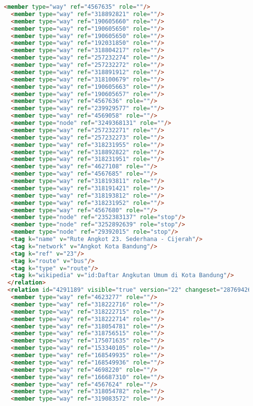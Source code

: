 \begin{lstlisting}[language=HTML,basicstyle=\tiny,caption=bandung1.xml]
  <member type="way" ref="4567635" role=""/>
  <member type="way" ref="318892821" role=""/>
  <member type="way" ref="190605660" role=""/>
  <member type="way" ref="190605650" role=""/>
  <member type="way" ref="190605650" role=""/>
  <member type="way" ref="192031850" role=""/>
  <member type="way" ref="318804217" role=""/>
  <member type="way" ref="257232274" role=""/>
  <member type="way" ref="257232272" role=""/>
  <member type="way" ref="318891912" role=""/>
  <member type="way" ref="318100679" role=""/>
  <member type="way" ref="190605663" role=""/>
  <member type="way" ref="190605657" role=""/>
  <member type="way" ref="4567636" role=""/>
  <member type="way" ref="239929577" role=""/>
  <member type="way" ref="4569058" role=""/>
  <member type="node" ref="3249368131" role=""/>
  <member type="way" ref="257232271" role=""/>
  <member type="way" ref="257232273" role=""/>
  <member type="way" ref="318231955" role=""/>
  <member type="way" ref="318892822" role=""/>
  <member type="way" ref="318231951" role=""/>
  <member type="way" ref="4627108" role=""/>
  <member type="way" ref="4567685" role=""/>
  <member type="way" ref="318193811" role=""/>
  <member type="way" ref="318191421" role=""/>
  <member type="way" ref="318193812" role=""/>
  <member type="way" ref="318231952" role=""/>
  <member type="way" ref="4567680" role=""/>
  <member type="node" ref="2352383137" role="stop"/>
  <member type="node" ref="3252892639" role="stop"/>
  <member type="node" ref="29392015" role="stop"/>
  <tag k="name" v="Rute Angkot 23. Sederhana - Cijerah"/>
  <tag k="network" v="Angkot Kota Bandung"/>
  <tag k="ref" v="23"/>
  <tag k="route" v="bus"/>
  <tag k="type" v="route"/>
  <tag k="wikipedia" v="id:Daftar Angkutan Umum di Kota Bandung"/>
 </relation>
 <relation id="4291189" visible="true" version="22" changeset="28769426" timestamp="2015-02-11T10:05:22Z" user="shravan91" uid="1051550">
  <member type="way" ref="4623277" role=""/>
  <member type="way" ref="318222716" role=""/>
  <member type="way" ref="318222715" role=""/>
  <member type="way" ref="318222714" role=""/>
  <member type="way" ref="318054781" role=""/>
  <member type="way" ref="318756515" role=""/>
  <member type="way" ref="175071635" role=""/>
  <member type="way" ref="153340105" role=""/>
  <member type="way" ref="168549935" role=""/>
  <member type="way" ref="168549936" role=""/>
  <member type="way" ref="4698220" role=""/>
  <member type="way" ref="166687310" role=""/>
  <member type="way" ref="4567624" role=""/>
  <member type="way" ref="318054782" role=""/>
  <member type="way" ref="319083572" role=""/>

\end{lstlisting}
